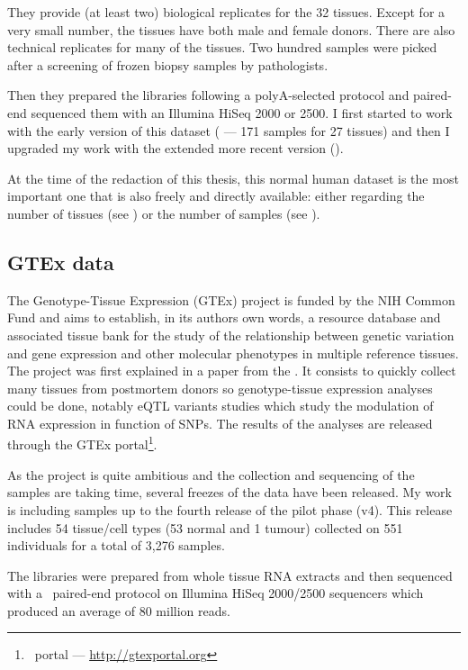 They provide (at least two) biological replicates for the 32 tissues.
Except for a very small number, the tissues have both male and female donors.
There are also technical replicates for many of the tissues. Two hundred samples
were picked after a screening of frozen biopsy samples by pathologists.

Then they prepared the libraries following a polyA-selected protocol and
paired-end sequenced them with an Illumina HiSeq 2000 or 2500. I first started
to work with the early version of this dataset
( --- 171 samples for 27 tissues)
and then I upgraded my work with the extended more recent version
().

At the time of the redaction of this thesis, this normal human dataset is the
most important one that is also freely and directly available: either regarding
the number of tissues (see )
or the number of samples (see ).


\subsection{GTEx data}

The Genotype-Tissue Expression (\gls{GTEx}) project is funded by the \gls{NIH}
Common Fund and aims to establish, in its authors own words,
a resource database and associated tissue bank
for the study of the relationship between genetic variation and gene expression
and other molecular phenotypes in multiple reference tissues. The project was first
explained in a paper from the \cite{GTEx2013}. It consists to quickly collect
many tissues from postmortem donors so genotype-tissue expression analyses could
be done, notably \gls{eQTL} variants studies which study the modulation
of \gls{RNA} expression in function of \glspl{SNP}. The results of the
analyses are released through the GTEx portal\footnote{\Gtex\ portal --- %
\href{http://gtexportal.org}{http://gtexportal.org}}.

As the project is quite ambitious and the collection and sequencing of the samples
are taking time, several freezes of the data have been released. My work is
including samples up to the fourth release of the pilot phase (v4). This
release includes 54 tissue/cell types (53 normal and 1 tumour)
collected on 551 individuals for a total of 3,276 samples.

The libraries were prepared from whole tissue \gls{RNA} extracts and then
sequenced with a \mRNA\ paired-end protocol on Illumina HiSeq 2000/2500
sequencers which produced an average of 80 million reads.


